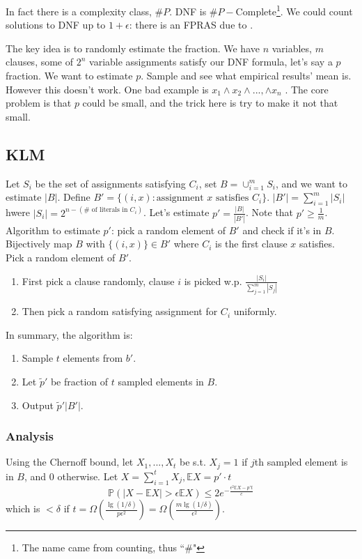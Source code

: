 \documentclass[11pt]{article}
\newcommand{\ep}{\epsilon}
\newcommand{\lqq}{``}
\begin{document}
In fact there is a complexity class, $\#P$. DNF is $\#P-$Complete\footnote{The name came from counting, thus \lqq\#"}. We could count solutions to DNF up to $1+\ep$: there is an FPRAS due to \cite{KarpLM89}.

The key idea is to randomly estimate the fraction. We have $n$ variables, $m$ clauses, some of $2^n$ variable assignments satisfy our DNF formula, let's say a $p$ fraction. We want to estimate $p$. Sample and see what empirical results' mean is. However this doesn't work. One bad example is $x_1\wedge x_2 \wedge ..., \wedge x_n$ . The core problem is that $p$ could be small, and the trick here is try to make it not that small.

\subsection{KLM \cite{KarpLM89}}

Let $S_i$  be the set of assignments satisfying $C_i$, set $B = \cup_{i=1}^m S_i$, and we want to estimate $|B|$. Define $B' = \{(i,x) : \text{assignment $x$ satisfies $C_i$}\}$. $|B'| = \sum_{i=1}^m |S_i|$ hwere $|S_i| = 2^{n-(\#\text{ of literals in }C_i)}$. Let's estimate $p' = \frac{|B|}{|B'|}$. Note that $p' \ge \frac{1}{m}$. \\

Algorithm to estimate $p'$: pick a random element of $B'$ and check if it's in $B$. Bijectively map $B$ with $\{(i,x)\} \in B'$ where $C_i$ is the first clause $x$ satisfies. Pick a random element of $B'$. 
\begin{enumerate}
\item First pick a clause randomly, clause $i$ is picked w.p. $\frac{|S_i|}{\sum_{j=1}^m |S_j|}$
\item Then pick a random satisfying assignment for $C_i$ uniformly.
\end{enumerate}

In summary, the algorithm is:

\begin{enumerate}
\item Sample $t$ elements from $b'$.
\item Let $\tilde{p}'$ be fraction of $t$ sampled elements in $B$.
\item Output $\tilde{p}' |B'|$.
\end{enumerate}

\subsubsection{Analysis}
Using the Chernoff bound, let $X_1,...,X_t$ be s.t. $X_j = 1$ if $j$th sampled element is in $B$, and $0$ otherwise. Let $X=\sum_{i=1}^{t}{X_j}, \mathbb{E} X = p' \cdot t$
$$\mathbb{P} (|X - \mathbb{E}X| > \ep \mathbb{E}X) \le 2 e^{-\frac{\ep^2 \mathbb{E}X-p't}{c}}$$
which is $< \delta$ if $t=\Omega(\frac{\lg(1/\delta)}{p \ep^2}) = \Omega(\frac{m\lg (1/\delta)}{\ep^2})$.
\end{document}
